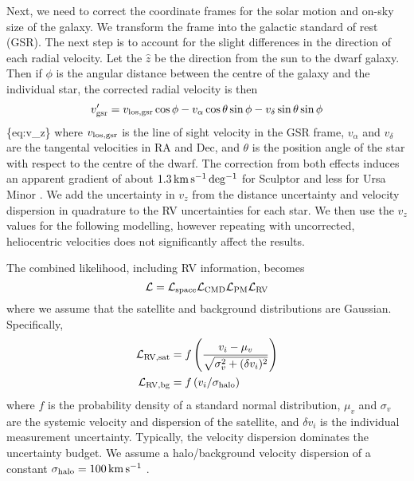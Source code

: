 Next, we need to correct the coordinate frames for the solar motion and
on-sky size of the galaxy. We transform the frame into the galactic
standard of rest (GSR). The next step is to account for the slight
differences in the direction of each radial velocity. Let the \(\hat z\)
be the direction from the sun to the dwarf galaxy. Then if \(\phi\) is
the angular distance between the centre of the galaxy and the individual
star, the corrected radial velocity is then \begin{equation}{
v_{\rm gsr}' = v_{\rm los, gsr}\cos\phi  - v_{\alpha}\cos\theta \sin\phi - v_\delta \sin\theta\sin\phi
}\end{equation} \{eq:v\_z\} where \(v_{\rm los, gsr}\) is the line of
sight velocity in the GSR frame, \(v_\alpha\) and \(v_\delta\) are the
tangental velocities in RA and Dec, and \(\theta\) is the position angle
of the star with respect to the centre of the dwarf. The correction from
both effects induces an apparent gradient of about \(1.3\,{\rm km\,s^{-1}\,deg^{-1}}\) for
Sculptor and less for Ursa Minor \citep[see
also][]{WMO2008, strigari2010}. We add the uncertainty in \(v_z\) from
the distance uncertainty and velocity dispersion in quadrature to the RV
uncertainties for each star. We then use the \(v_z\) values for the
following modelling, however repeating with uncorrected, heliocentric
velocities does not significantly affect the results.

The combined likelihood, including RV information, becomes
\begin{equation}{
{\cal L} = {\cal L}_{\rm space} {\cal L}_{\rm CMD} {\cal L}_{\rm PM} {\cal L}_{\rm RV}
}\end{equation} where we assume that the satellite and background
distributions are Gaussian. Specifically, \begin{equation}{
\begin{split}
{\cal L}_{\rm RV, sat} &= f\left( \frac{v_i -\mu_{v}}{\sqrt{\sigma_{v}^2 + (\delta v_i)^2}}\right) \\
{\cal L}_{\rm RV, bg} &= f\left( v_i /  \sigma_{\rm halo} \right)
\end{split}
}\end{equation} where \(f\) is the probability density of a standard
normal distribution, \(\mu_v\) and \(\sigma_v\) are the systemic
velocity and dispersion of the satellite, and \(\delta v_i\) is the
individual measurement uncertainty. Typically, the velocity dispersion
dominates the uncertainty budget. We assume a halo/background velocity
dispersion of a constant \(\sigma_{\rm halo} = 100\,{\rm km\,s^{-1}}\)
\citep[e.g.][]{brown+2010}.

